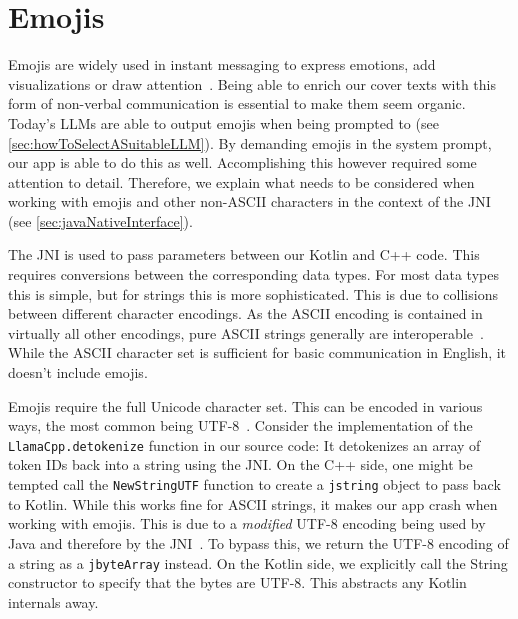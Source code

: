 \section{Emojis}
\label{sec:emojis}
Emojis are widely used in instant messaging to express emotions, add visualizations or draw attention~\cite{zhouGoodbyeTextHello2017}. Being able to enrich our cover texts with this form of non-verbal communication is essential to make them seem organic. Today's \glspl{LLM} are able to output emojis when being prompted to (see \cref{sec:howToSelectASuitableLLM}). By demanding emojis in the system prompt, our app is able to do this as well. Accomplishing this however required some attention to detail. Therefore, we explain what needs to be considered when working with emojis and other non-ASCII characters in the context of the \gls{JNI} (see \cref{sec:javaNativeInterface}).

The \gls{JNI} is used to pass parameters between our Kotlin and C++ code. This requires conversions between the corresponding data types. For most data types this is simple, but for strings this is more sophisticated. This is due to collisions between different character encodings. As the ASCII encoding is contained in virtually all other encodings, pure ASCII strings generally are interoperable~\cite{gleaveMakingCompressionAlgorithms2017}. While the ASCII character set is sufficient for basic communication in English, it doesn't include emojis.

Emojis require the full Unicode character set. This can be encoded in various ways, the most common being UTF-8~\cite{gleaveMakingCompressionAlgorithms2017}. Consider the implementation of the \lstinline|LlamaCpp.detokenize| function in our source code: It detokenizes an array of token IDs back into a string using the \gls{JNI}. On the C++ side, one might be tempted call the \lstinline|NewStringUTF| function to create a \lstinline|jstring| object to pass back to Kotlin. While this works fine for ASCII strings, it makes our app crash when working with emojis. This is due to a \textit{modified} UTF-8 encoding being used by Java and therefore by the \gls{JNI}~\cite{oracleJNIFunctions}. To bypass this, we return the UTF-8 encoding of a string as a \lstinline|jbyteArray| instead. On the Kotlin side, we explicitly call the String constructor to specify that the bytes are UTF-8. This abstracts any Kotlin internals away.

